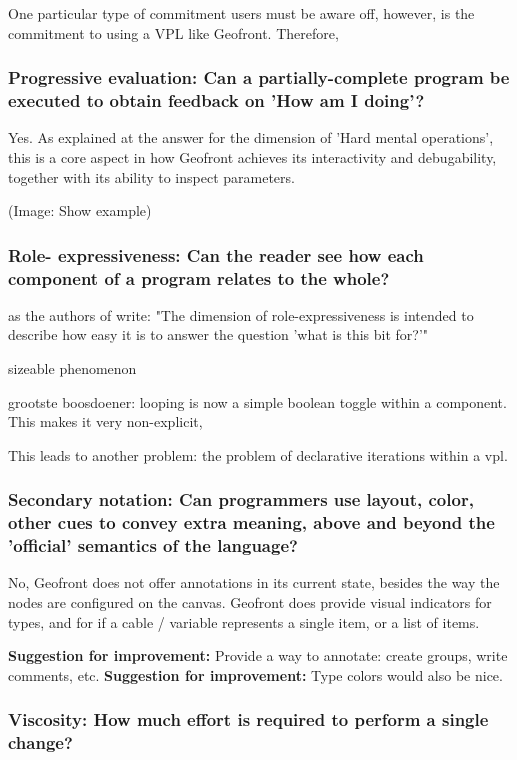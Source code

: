One particular type of commitment users must be aware off, however, is the commitment to using a \ac{VPL} like Geofront. 
Therefore, 


\subsubsection*{Progressive evaluation: Can a partially-complete program be executed to obtain feedback on 'How am I doing'?}

Yes. 
As explained at the answer for the dimension of 'Hard mental operations', this is a core aspect in how Geofront achieves its interactivity and debugability, together with its ability to inspect parameters. 

(Image: Show example)

\subsubsection*{Role- expressiveness: Can the reader see how each component of a program relates to the whole?}

as the authors of \cite[]{green_usability_1996} write: "The dimension of role-expressiveness is intended to describe how easy it is to answer the question 'what is this bit for?'"

sizeable phenomenon

grootste boosdoener: looping is now a simple boolean toggle within a component. 
This makes it very non-explicit, 

This leads to another problem: the problem of declarative iterations within a vpl. 


\subsubsection*{Secondary notation: Can programmers use layout, color, other cues to convey extra meaning, above and beyond the 'official' semantics of the language?}

No, Geofront does not offer annotations in its current state, besides the way the nodes are configured on the canvas.  
Geofront does provide visual indicators for types, and for if a cable / variable represents a single item, or a list of items.

\textbf{Suggestion for improvement:} Provide a way to annotate: create groups, write comments, etc. 
\textbf{Suggestion for improvement:} Type colors would also be nice.

\subsubsection*{Viscosity: How much effort is required to perform a single change?}

